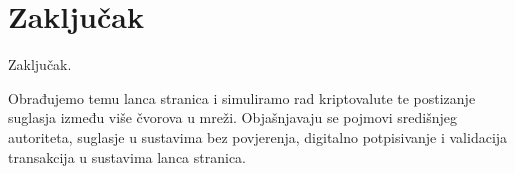 \documentclass[utf8, zavrsni]{fer}
\begin{document}


\chapter{Zaključak}
Zaključak.





\begin{sazetak}
	Obrađujemo temu lanca stranica i simuliramo rad kriptovalute te postizanje suglasja između više čvorova u mreži. Objašnjavaju se pojmovi središnjeg autoriteta, suglasje u sustavima bez povjerenja, digitalno potpisivanje i validacija transakcija u sustavima lanca stranica.

\end{sazetak}

\begin{abstract}
	
\end{abstract}
\end{document}
